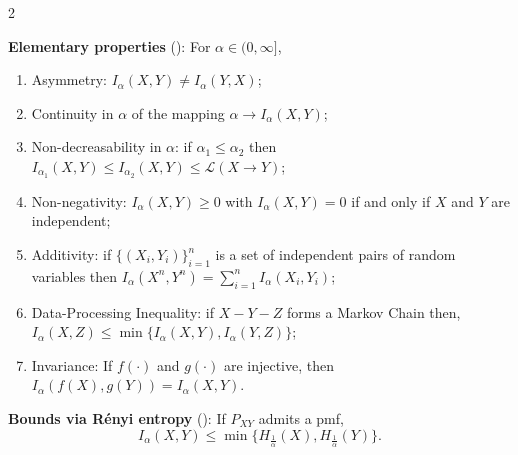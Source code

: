 \documentclass{article}
\numberwithin{theorem}{section}
\numberwithin{example}{section}
\numberwithin{remark}{section}
\numberwithin{definition}{section}
\newcommand{\ml}[2]{\mathcal{L}\left(#1  \!\!  \to  \!\!   #2\right)} %
\begin{document}
\begin{table}[tbp]
{\begin{minipage}[t][60\baselineskip][t]{\textwidth}
\begin{multicols}{2}
    \begin{samepage}
      \textbf{Elementary properties
      }(): For $\alpha \in
      (0,\infty]$,
      \begin{enumerate}
        \item Asymmetry: $I_\alpha(X,Y)\neq I_\alpha(Y,X)$\label{prop:Tableasymm};
        \item Continuity in $\alpha$ of the mapping $\alpha\to I_\alpha(X,Y)$;%
        \item Non-decreasability in $\alpha$: if $\alpha_1\leq \alpha_2$ then $I_{\alpha_1}(X,Y)\leq I_{\alpha_2}(X,Y)\leq \ml{X}{Y}$\label{prop:TablenonDecr};
        \item Non-negativity: $I_\alpha(X,Y)\geq 0$ with $I_\alpha(X,Y)=0$ if and only if $X$ and $Y$ are independent\label{prop:TablenonNeg};
        \item Additivity: if $\{(X_i,Y_i)\}_{i=1}^n$ is a set of independent pairs of random variables then $I_\alpha(X^n,Y^n)=\sum_{i=1}^n I_\alpha(X_i,Y_i)$\label{prop:Tableadd};  
        \item Data-Processing Inequality:  if $X-Y-Z$ forms a Markov Chain then, $I_\alpha(X,Z)\leq \min \{I_\alpha(X,Y),I_\alpha(Y,Z)\}$;
        \item Invariance:  If $f(\cdot)$ and $g(\cdot)$ are injective, then $I_\alpha(f(X),g(Y)) = I_\alpha(X,Y)$.
      \end{enumerate}
    \end{samepage}


    \begin{samepage}
      \textbf{Bounds via R\'enyi entropy }(): If $P_{XY}$ admits a pmf,
\begin{equation*}
    I_\alpha(X,Y) \leq \min \{ H_{\frac1\alpha}(X), H_{\frac1\alpha}(Y) \}.
\end{equation*}
    \end{samepage}



\end{multicols}
\end{minipage}}
\end{table}
\end{document}
